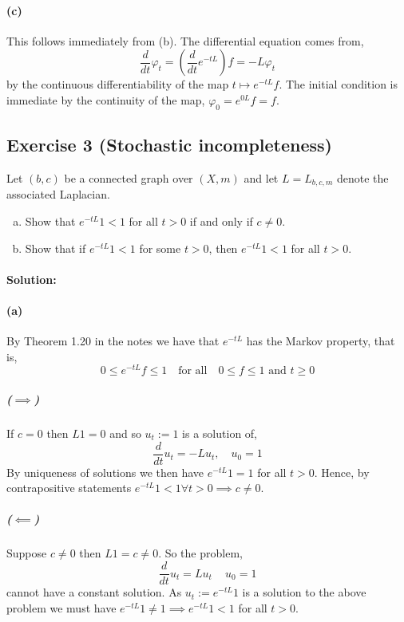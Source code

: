 \paragraph{(c)}
This follows immediately from (b). The differential equation comes from,
\begin{equation*}
	\frac{d}{dt}\varphi_{t} = \left(\frac{d}{dt}e^{-tL}\right)f = -L\varphi_{t}
\end{equation*}
by the continuous differentiability of the map $t\mapsto e^{-tL}f$. The initial condition is immediate by the continuity of the map, $\varphi_{0} = e^{0L}f = f$.

\subsection{Exercise 3 (Stochastic incompleteness)}

Let $(b,c)$ be a connected graph over $(X,m)$ and let $L=L_{b,c,m}$ denote the associated Laplacian.
\begin{enumerate}[(a)]
	\item 
		Show that $e^{-tL}1<1$ for all $t>0$ if and only if $c\neq 0$.
	\item 
		Show that if $e^{-tL}1<1$ for some $t>0$, then $e^{-tL}1<1$ for all $t>0$.
\end{enumerate}

\paragraph{Solution:}

\paragraph{(a)}
By Theorem 1.20 in the notes we have that $e^{-tL}$ has the Markov property, that is,
\begin{equation*}
	0\leq e^{-tL}f\leq 1 \quad \text{for all} \quad 0\leq f\leq 1\text{ and }t\geq 0
\end{equation*}

\subparagraph{($\implies$)}
If $c=0$ then $L1=0$ and so $u_{t}:=1$ is a solution of,
\begin{equation*}
	\frac{d}{dt}u_{t} = -Lu_{t},\quad u_{0} = 1
\end{equation*}
By uniqueness of solutions we then have $e^{-tL}1 = 1$ for all $t>0$. Hence, by contrapositive statements $e^{-tL}1 < 1 \forall t>0\implies c\neq 0$.

\subparagraph{($\impliedby$)}
Suppose $c\neq 0$ then $L1=c\neq 0$. So the problem,
\begin{equation*}
	\frac{d}{dt}u_{t} = Lu_{t}\,\quad u_{0}=1
\end{equation*}
cannot have a constant solution. As $u_{t}:=e^{-tL}1$ is a solution to the above problem we must have $e^{-tL}1\neq 1\implies e^{-tL}1<1$ for all $t>0$.


